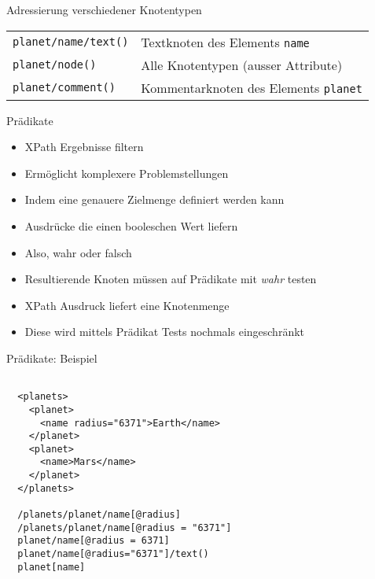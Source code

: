 \documentclass{beamer}
\begin{document}
\begin{frame}[fragile]{Adressierung verschiedener Knotentypen}
	
	\centering
	\begin{tabular}{l|l}
		\texttt{planet/name/text()} & Textknoten des Elements \texttt{name} \\
		\texttt{planet/node()} & Alle Knotentypen (ausser Attribute) \\
		\texttt{planet/comment()} & Kommentarknoten des Elements \texttt{planet} \\
	\end{tabular}
	
\end{frame}

\begin{frame}{Prädikate}
	
	\begin{itemize}
		\item XPath Ergebnisse filtern
		\item Ermöglicht komplexere Problemstellungen
		\item Indem eine genauere Zielmenge definiert werden kann
		\item Ausdrücke die einen booleschen Wert liefern
		\item Also, wahr oder falsch
		\item Resultierende Knoten müssen auf Prädikate mit \emph{wahr} testen
		\item XPath Ausdruck liefert eine Knotenmenge 
		\item Diese wird mittels Prädikat Tests nochmals eingeschränkt
	\end{itemize}
	
\end{frame}

\begin{frame}[fragile]{Prädikate: Beispiel}
	
	\lstset{language=XML}
	\begin{lstlisting}
	
  <planets>
    <planet>
      <name radius="6371">Earth</name>
    </planet>
    <planet>
      <name>Mars</name>
    </planet>
  </planets>

  /planets/planet/name[@radius]
  /planets/planet/name[@radius = "6371"]
  planet/name[@radius = 6371]
  planet/name[@radius="6371"]/text()
  planet[name]
	\end{lstlisting}
	
\end{frame}
\end{document}
